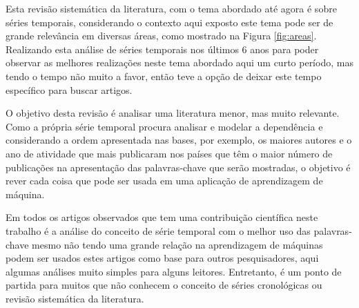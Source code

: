 Esta revisão sistemática da literatura, com o tema abordado até agora é sobre séries temporais, considerando o contexto aqui exposto este tema pode ser de grande relevância em diversas áreas, como mostrado na Figura \ref{fig:areas}. Realizando esta análise de séries temporais nos últimos 6 anos para poder observar as melhores realizações neste tema abordado aqui um curto período, mas tendo o tempo não muito a favor, então teve a opção de deixar este tempo específico para buscar artigos.

O objetivo desta revisão é analisar uma literatura menor, mas muito relevante. Como a própria série temporal procura analisar e modelar a dependência e considerando a ordem apresentada nas bases, por exemplo, os maiores autores e o ano de atividade que mais publicaram nos países que têm o maior número de publicações na apresentação das palavras-chave que serão mostradas, o objetivo é rever cada coisa que pode ser usada em uma aplicação de aprendizagem de máquina.

Em todos os artigos observados que tem uma contribuição científica neste trabalho é a análise do conceito de série temporal com o melhor uso das palavras-chave mesmo não tendo uma grande relação na aprendizagem de máquinas podem ser usados estes artigos como base para outros pesquisadores, aqui algumas análises muito simples para alguns leitores. Entretanto, é um ponto de partida para muitos que não conhecem o conceito de séries cronológicas ou revisão sistemática da literatura.
